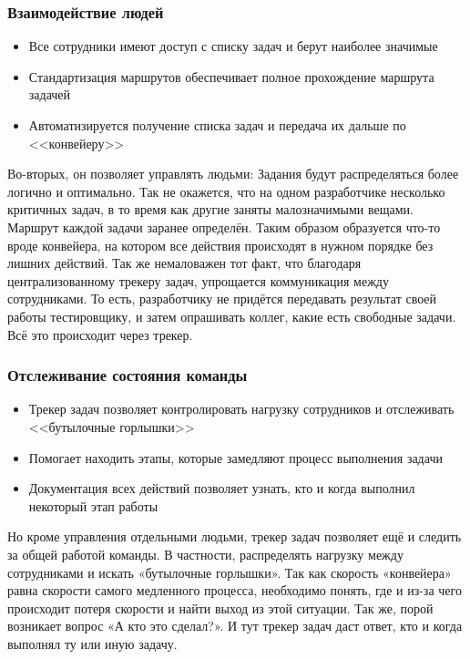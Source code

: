 \documentclass{../industrial-development}
\begin{document}
\begin{frame} \frametitle{Взаимодействие людей}
	\begin{itemize}
		\item Все сотрудники имеют доступ с списку задач и берут наиболее значимые
		\item Стандартизация маршрутов обеспечивает полное прохождение маршрута задачей
		\item Автоматизируется получение списка задач и передача их дальше по <<конвейеру>>
	\end{itemize}
\end{frame}

\lecturenotes
Во-вторых, он позволяет управлять людьми:
Задания будут распределяться более логично и оптимально. Так не окажется, что на одном разработчике несколько критичных задач, в то время как другие заняты малозначимыми вещами.
Маршрут каждой задачи заранее определён. Таким образом образуется что-то вроде конвейера, на котором все действия происходят в нужном порядке без лишних действий.
Так же немаловажен тот факт, что благодаря централизованному трекеру задач, упрощается коммуникация между сотрудниками. То есть, разработчику не придётся передавать результат своей работы тестировщику, и затем опрашивать коллег, какие есть свободные задачи. Всё это происходит через трекер.

\begin{frame} \frametitle{Отслеживание состояния команды}
	\begin{itemize}
		\item Трекер задач позволяет контролировать нагрузку сотрудников и отслеживать <<бутылочные горлышки>>
		\item Помогает находить этапы, которые замедляют процесс выполнения задачи
		\item Документация всех действий позволяет узнать, кто и когда выполнил некоторый этап работы
	\end{itemize}
\end{frame}

\lecturenotes
Но кроме управления отдельными людьми, трекер задач позволяет ещё и следить за общей работой команды. В частности, распределять нагрузку между сотрудниками и искать «бутылочные горлышки». Так как скорость «конвейера» равна скорости самого медленного процесса, необходимо понять, где и из-за чего происходит потеря скорости и найти выход из этой ситуации.
Так же, порой возникает вопрос «А кто это сделал?». И тут трекер задач даст ответ, кто и когда выполнял ту или иную задачу.
\end{document}
